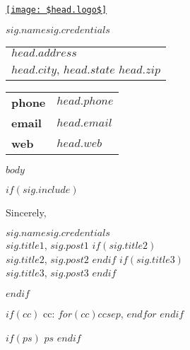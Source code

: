 \documentclass[$size$,letterpaper]{letter}
\makeatletter
\newcommand{\header}{
    {\hypersetup{hidelinks}
    \noindent
    \parbox[b][0.625in][t]{6.5in}{
        \parbox[b][0.625in][t]{3.74in}
            {\href{$head.logourl$}
            {\texttt{[image: \$head.logo\$]}}}\hfill
        \parbox[b][0.625in][t]{2in}{
            \setlength{\baselineskip}{9pt}
                \small
                \textbf{$sig.name$$sig.credentials$}\vspace{6pt}\\
                \footnotesize
                \begin{tabular}{@{}l}
                $head.address$\\
                $head.city$, $head.state$ $head.zip$\vspace{3pt}\\
                \end{tabular}
                		
                \begin{tabular}{@{}ll}
				{\bf phone} & \href{tel:$head.phone$}{$head.phone$} \\            
				{\bf email} & \href{mailto:$head.email$}{$head.email$} \\         
				{\bf web} & \href{$head.web$}{$head.web$}  
				\end{tabular}
                
                \normalsize
            }
        }}
    }
\makeatother
\begin{document}
\pagestyle{specialfooter}

\header

\vspace{0.5in}

$body$

$if(sig.include)$
    \begin{minipage}[t]{6.5in}
    \closing{Sincerely,}
    \vspace{-0.2in}
    \small
    {\bf $sig.name$}{$sig.credentials$}\vspace{6pt}\\
    {\bf $sig.title1$}, {$sig.post1$}
    $if(sig.title2)$
        \\
        {\bf $sig.title2$}, {$sig.post2$}
    $endif$
    $if(sig.title3)$
        \\
        {\bf $sig.title3$}, {$sig.post3$}
    $endif$
    \end{minipage}
$endif$

$if(cc)$
    cc: $for(cc)$$cc$$sep$, $endfor$
$endif$

$if(ps)$
    $ps$
$endif$

\vspace{0.25in}


\end{document}
